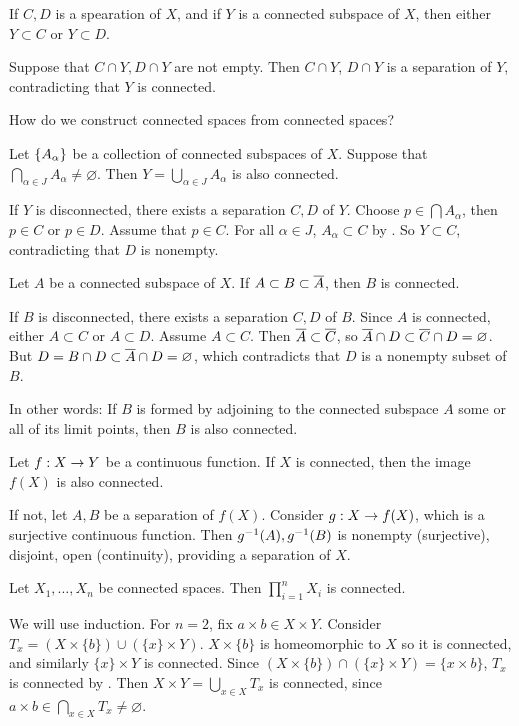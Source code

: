  If \(C, D\) is a spearation of \(X\), and if \(Y\) is a connected subspace of \(X\), then either \(Y \subset C\) or \(Y \subset D\).

\pf Suppose that \(C \cap Y, D \cap Y\) are not empty. Then \(C \cap Y\), \(D \cap Y\) is a separation of \(Y\), contradicting that \(Y\) is connected.

How do we construct connected spaces from connected spaces?

 Let \(\left\{ A_\alpha \right\}\) be a collection of connected subspaces of \(X\). Suppose that \(\bigcap_{\alpha \in J} A_\alpha \neq \varnothing\). Then \(Y = \bigcup_{\alpha \in J} A_\alpha\) is also connected.

\pf If \(Y\) is disconnected, there exists a separation \(C, D\) of \(Y\). Choose \(p \in \bigcap A_\alpha\), then \(p \in C\) or \(p \in D\). Assume that \(p \in C\). For all \(\alpha \in J\), \(A_\alpha \subset C\) by . So \(Y \subset C\), contradicting that \(D\) is nonempty.

 Let \(A\) be a connected subspace of \(X\). If \(A \subset B \subset \overline{A}\), then \(B\) is connected.

\pf If \(B\) is disconnected, there exists a separation \(C, D\) of \(B\). Since \(A\) is connected, either \(A \subset C\) or \(A \subset D\). Assume \(A \subset C\). Then \(\overline{A} \subset \overline{C}\), so \(\overline{A} \cap D \subset \overline{C} \cap D = \varnothing\). But \(D = B \cap D \subset \overline{A} \cap D = \varnothing\), which contradicts that \(D\) is a nonempty subset of \(B\).

In other words: If \(B\) is formed by adjoining to the connected subspace \(A\) some or all of its limit points, then \(B\) is also connected.

 Let \(f : X \rightarrow Y\) be a continuous function. If \(X\) is connected, then the image \(f(X)\) is also connected.

\pf If not, let \(A, B\) be a separation of \(f(X)\). Consider \(g : X \rightarrow f(X)\), which is a surjective continuous function. Then \(g^{-1}(A), g^{-1}(B)\) is nonempty (surjective), disjoint, open (continuity), providing a separation of \(X\).

 Let \(X_1, \dots, X_n\) be connected spaces. Then \(\prod_{i=1}^n X_i\) is connected.

\pf We will use induction. For \(n = 2\), fix \(a \times b \in X \times Y\). Consider \(T_x = (X \times \{b\}) \cup (\{x\} \times Y)\). \(X \times \{b\}\) is homeomorphic to \(X\) so it is connected, and similarly \(\{x\} \times Y\) is connected. Since \((X \times \{b\}) \cap (\{x\} \times Y) = \{x \times b\}\), \(T_x\) is connected by . Then \(X \times Y = \bigcup_{x \in X} T_x\) is connected, since \(a \times b \in \bigcap_{x \in X} T_x \neq \varnothing\).

